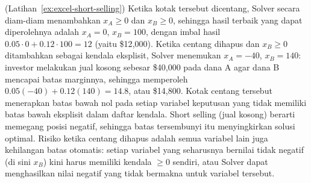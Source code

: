 \Needspace{0.34\textheight}
\begin{solution}(Latihan~\ref{ex:excel-short-selling})
Ketika kotak tersebut dicentang, Solver secara diam-diam menambahkan $x_A \geq 0$ dan $x_B \geq 0$, sehingga hasil terbaik yang dapat diperolehnya adalah $x_A = 0$, $x_B = 100$, dengan imbal hasil $0.05 \cdot 0 + 0.12 \cdot 100 = 12$ (yaitu \$12{,}000).  Ketika centang dihapus dan $x_B \geq 0$ ditambahkan sebagai kendala eksplisit, Solver menemukan $x_A = -40$, $x_B = 140$: investor melakukan jual kosong sebesar \$40{,}000 pada dana A agar dana B mencapai batas marginnya, sehingga memperoleh $0.05(-40) + 0.12(140) = 14.8$, atau \$14{,}800.
Kotak centang tersebut menerapkan batas bawah nol pada setiap variabel keputusan yang tidak memiliki batas bawah eksplisit dalam daftar kendala.  Short selling (jual kosong) berarti memegang posisi negatif, sehingga batas tersembunyi itu menyingkirkan solusi optimal.  Risiko ketika centang dihapus adalah semua variabel lain juga kehilangan batas otomatis: setiap variabel yang seharusnya bernilai tidak negatif (di sini $x_B$) kini harus memiliki kendala $\geq 0$ sendiri, atau Solver dapat menghasilkan nilai negatif yang tidak bermakna untuk variabel tersebut.
\end{solution}

